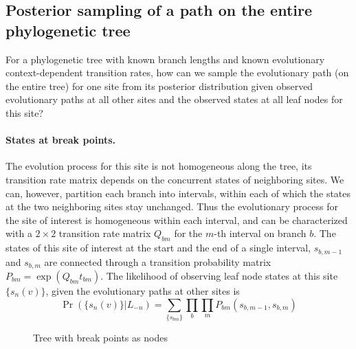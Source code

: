 \documentclass[11pt]{article}
\begin{document}
\subsection{Posterior sampling of a path on the entire phylogenetic tree}
For a phylogenetic tree with known branch lengths and known
evolutionary context-dependent transition rates, how can we sample the
evolutionary path (on the entire tree) for one site from its posterior
distribution given observed evolutionary paths at all other sites and the
observed states at all leaf nodes for this site?

\paragraph{States at break points.}
The evolution process for this site is not homogeneous along the tree,
its transition rate matrix depends on the concurrent states of
neighboring sites. We can, however, partition each branch into
intervals, within each of which the states at the two neighboring
sites stay unchanged. Thus the evolutionary process for the site of
interest is homogeneous within each interval, and can be characterized
with a $2\times2$ transition rate matrix $Q_{bm}$ for the $m$-th
interval on branch $b$. The states of this site of interest at the
start and the end of a single interval, $s_{b,m-1}$ and $s_{b,m}$ are
connected through a transition probability matrix $P_{bm} =
\exp(Q_{bm}t_{bm})$.
The likelihood of observing leaf node states at this site
$\{s_n(v)\}$, given the evolutionary paths at other sites is
\[
\Pr(\{s_n(v)\} | L_{-n}) = \sum_{\{s_{bm}\}} \prod_{b} \prod_{m} P_{bm}(s_{b,m-1}, s_{b, m})
\]

\begin{figure}\label{fig:treebreak}
  \caption{Tree with break points as nodes}
\end{figure}
\end{document}
